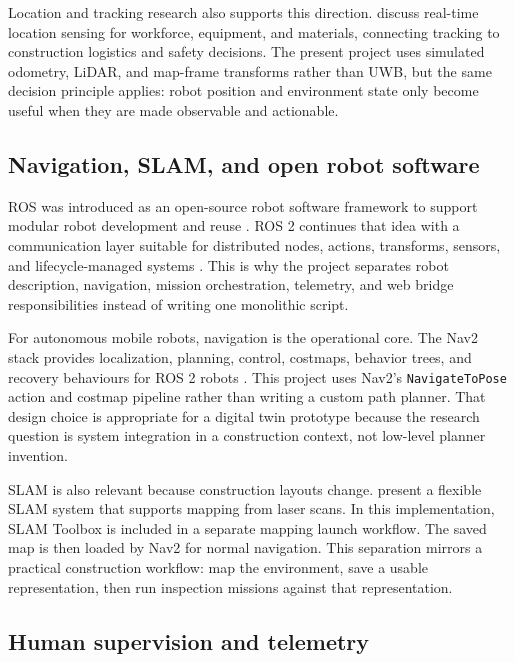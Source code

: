 \documentclass[12pt,a4paper]{article}
\begin{document}
Location and tracking research also supports this direction. \citet{teizer2008ultrawideband} discuss real-time location sensing for workforce, equipment, and materials, connecting tracking to construction logistics and safety decisions. The present project uses simulated odometry, LiDAR, and map-frame transforms rather than UWB, but the same decision principle applies: robot position and environment state only become useful when they are made observable and actionable.

\subsection{Navigation, SLAM, and open robot software}

ROS was introduced as an open-source robot software framework to support modular robot development and reuse \citep{quigley2009ros}. ROS 2 continues that idea with a communication layer suitable for distributed nodes, actions, transforms, sensors, and lifecycle-managed systems \citep{ros2humble}. This is why the project separates robot description, navigation, mission orchestration, telemetry, and web bridge responsibilities instead of writing one monolithic script.

For autonomous mobile robots, navigation is the operational core. The Nav2 stack provides localization, planning, control, costmaps, behavior trees, and recovery behaviours for ROS 2 robots \citep{macenski2020marathon, nav2humble}. This project uses Nav2's \texttt{NavigateToPose} action and costmap pipeline rather than writing a custom path planner. That design choice is appropriate for a digital twin prototype because the research question is system integration in a construction context, not low-level planner invention.

SLAM is also relevant because construction layouts change. \citet{kohlbrecher2011slam} present a flexible SLAM system that supports mapping from laser scans. In this implementation, SLAM Toolbox is included in a separate mapping launch workflow. The saved map is then loaded by Nav2 for normal navigation. This separation mirrors a practical construction workflow: map the environment, save a usable representation, then run inspection missions against that representation.

\subsection{Human supervision and telemetry}
\end{document}
